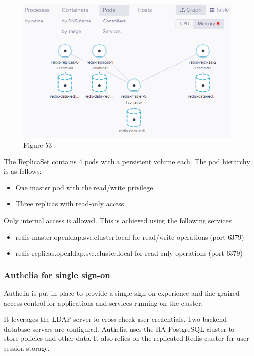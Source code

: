 \begin{figure}[H]\centering
\includegraphics[width=1.0\textwidth,angle=00]{assets/f53.png}
\caption{Figure 53 }
\label{fig:f53}
\end{figure}

The ReplicaSet contains 4 pods with a persistent volume each. The pod hierarchy is as follows: 
\begin{itemize}[label={--}]
\item One master pod with the read/write privilege. 
\item Three replicas with read-only access. 
\end{itemize}
Only internal access is allowed. This is achieved using the following services: 

\begin{itemize}[label={--}]
\item redis-master.openldap.svc.cluster.local for read/write operations (port 6379) 
\item redis-replicas.openldap.svc.cluster.local for read-only operations (port 6379) 
\end{itemize}



\subsubsection{Authelia for single sign-on }

Authelia is put in place to provide a single sign-on experience and fine-grained access control for applications and services running on the cluster.  


It leverages the LDAP server to cross-check user credentials. Two backend database servers are configured. Authelia uses the HA PostgreSQL cluster to store policies and other data. It also relies on the replicated Redis cluster for user session storage. 

